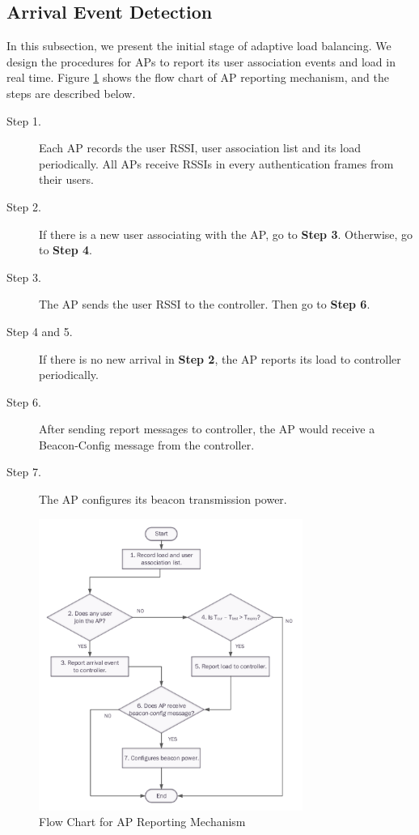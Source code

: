 \subsection{Arrival Event Detection}\label{section:3.2}
In this subsection, we present the initial stage of adaptive load balancing. We design the procedures for APs to report its user association events and load in real time. Figure \ref{fig:flowdiagram_trendindicator_ap} shows the flow chart of AP reporting mechanism, and the steps are described below.

\begin{description}
  \item [Step 1.] Each AP records the user RSSI, user association list and its load periodically. All APs receive RSSIs in every authentication frames from their users.
  \item [Step 2.] If there is a new user associating with the AP, go to \textbf{Step 3}. Otherwise, go to \textbf{Step 4}.
  \item [Step 3.] The AP sends the user RSSI to the controller. Then go to \textbf{Step 6}.
  \item [Step 4 and 5.] If there is no new arrival in \textbf{Step 2}, the AP reports its load to controller periodically.
  \item [Step 6.] After sending report messages to controller, the AP would receive a Beacon-Config message from the controller.
  \item [Step 7.] The AP configures its beacon transmission power.
\end{description}

\begin{figure}[tbp]
\centering
\includegraphics[width=3.4in]{images/flowdiagram_trendindicator_ap.pdf}
\caption{Flow Chart for AP Reporting Mechanism}
\label{fig:flowdiagram_trendindicator_ap}
\end{figure}

